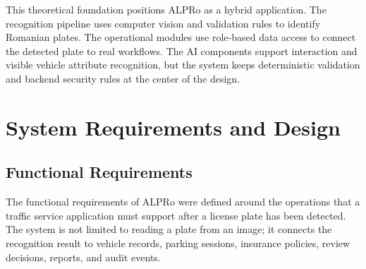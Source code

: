 ﻿\documentclass[12pt,a4paper]{article}
\begin{document}
This theoretical foundation positions ALPRo as a hybrid application. The recognition pipeline uses computer vision and validation rules to identify Romanian plates. The operational modules use role-based data access to connect the detected plate to real workflows. The AI components support interaction and visible vehicle attribute recognition, but the system keeps deterministic validation and backend security rules at the center of the design.

\section{System Requirements and Design}

\subsection{Functional Requirements}

The functional requirements of ALPRo were defined around the operations that a traffic service application must support after a license plate has been detected. The system is not limited to reading a plate from an image; it connects the recognition result to vehicle records, parking sessions, insurance policies, review decisions, reports, and audit events.
\end{document}
